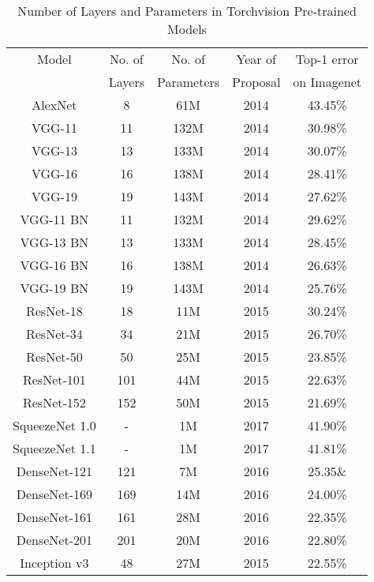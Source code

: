 \documentclass[conference]{IEEEtran}
\begin{document}
\begin{table}
		\caption{Number of Layers and Parameters in Torchvision Pre-trained Models}
		\label{Model} \centering
\begin{tabular}{|c|c|c|c|c|}	\hline 

    Model & No. of  &No. of      &Year of 	& Top-1 error \\ 
          &  Layers & Parameters & Proposal & on Imagenet \\
    
    \hline AlexNet & 8	   &    61M    & 2014  & 43.45\%   \\ 
    \hline VGG-11  & 11    &   132M    & 2014  & 30.98\%   \\ 
    \hline VGG-13  & 13    &   133M    & 2014  & 30.07\%   \\
    \hline VGG-16  & 16    &   138M    & 2014  & 28.41\%   \\
    \hline VGG-19  & 19    &   143M    & 2014  & 27.62\%   \\
    \hline VGG-11 BN    & 11    & 132M   & 2014  & 29.62\% \\
    \hline VGG-13 BN    & 13    & 133M   & 2014  & 28.45\% \\
    \hline VGG-16 BN    & 16    & 138M   & 2014  & 26.63\% \\
    \hline VGG-19 BN    & 19    & 143M   & 2014  & 25.76\% \\
    \hline ResNet-18    & 18    & 11M    & 2015  & 30.24\% \\
    \hline ResNet-34    & 34    & 21M    & 2015  & 26.70\% \\
    \hline ResNet-50    & 50    & 25M    & 2015  & 23.85\% \\
    \hline ResNet-101   & 101   & 44M    & 2015  & 22.63\% \\
    \hline ResNet-152   & 152   & 50M    & 2015  & 21.69\% \\
    \hline SqueezeNet 1.0 &  -  & 1M     & 2017  & 41.90\% \\
    \hline SqueezeNet 1.1 &  -  & 1M     & 2017  & 41.81\% \\
    \hline DenseNet-121 & 121   & 7M     & 2016  & 25.35\& \\
    \hline DenseNet-169 & 169   & 14M    & 2016  & 24.00\% \\
    \hline DenseNet-161 & 161   & 28M    & 2016  & 22.35\% \\
    \hline DenseNet-201 & 201   & 20M    & 2016  & 22.80\% \\
    \hline Inception v3 & 48    & 27M    & 2015  & 22.55\% \\

\end{tabular}
\end{table}
\end{document}
